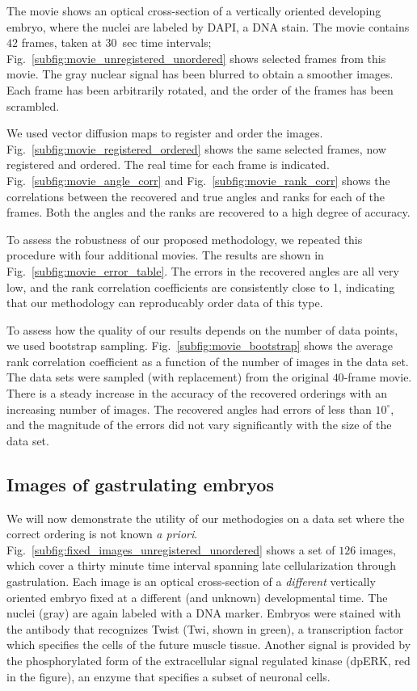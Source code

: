 \documentclass{pnastwo}
\newcommand{\fig}[0]{Fig.}
\begin{document}
\begin{article}
The movie shows an optical cross-section of a vertically oriented developing embryo, where the nuclei are labeled by DAPI, a DNA stain.
%
The movie contains $42$ frames, taken at $30$~sec time intervals;
\fig~\ref{subfig:movie_unregistered_unordered} shows selected frames from this movie. 
%
The gray nuclear signal has been blurred to obtain a smoother images.
%
Each frame has been arbitrarily rotated, and the order of the frames has been scrambled.

We used vector diffusion maps to register and order the images. 
%
\fig~\ref{subfig:movie_registered_ordered} shows the same selected frames, now registered and ordered.
%
The real time for each frame is indicated.
%
\fig~\ref{subfig:movie_angle_corr} and \fig~\ref{subfig:movie_rank_corr}  shows the correlations between the recovered and true angles and ranks for each of the frames.
%
Both the angles and the ranks are recovered to a high degree of accuracy.

To assess the robustness of our proposed methodology, we repeated this procedure with four additional movies.
%
The results are shown in \fig~\ref{subfig:movie_error_table}. 
%
The errors in the recovered angles are all very low, and the rank correlation coefficients are consistently close to 1, indicating that our methodology can reproducably order data of this type.

To assess how the quality of our results depends on the number of data points, we used bootstrap sampling. 
%
\fig~\ref{subfig:movie_bootstrap} shows the average rank correlation coefficient as a function of the number of images in the data set.
%
The data sets were sampled (with replacement) from the original $40$-frame movie.
%
There is a steady increase in the accuracy of the recovered orderings with an increasing number of images.
%
The recovered angles had errors of less than $10^{\circ}$, and the magnitude of the errors did not vary significantly with the size of the data set.


\subsection{Images of gastrulating embryos}

We will now demonstrate the utility of our methodogies on a data set where the correct ordering is not known {\em a priori}.
%
\fig~\ref{subfig:fixed_images_unregistered_unordered} shows a set of $126$ images, which cover a thirty minute time interval spanning late cellularization through gastrulation.
%
Each image is an optical cross-section of a {\em different} vertically oriented embryo fixed at a different (and unknown) developmental time.
%
The nuclei (gray) are again labeled with a DNA marker.
%
Embryos were stained with the antibody that recognizes Twist (Twi, shown in green), a transcription factor which specifies the cells of the future muscle tissue.
%
Another signal is provided by the phosphorylated form of the extracellular signal regulated kinase (dpERK, red in the figure), an enzyme that specifies a subset of neuronal cells.


\end{article}
\end{document}
